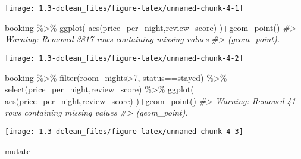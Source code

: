 \documentclass[
]{article}
\newenvironment{Shaded}{\begin{snugshade}}{\end{snugshade}}
\newcommand{\CommentTok}[1]{\textcolor[rgb]{0.56,0.35,0.01}{\textit{#1}}}
\newcommand{\DecValTok}[1]{\textcolor[rgb]{0.00,0.00,0.81}{#1}}
\newcommand{\FunctionTok}[1]{\textcolor[rgb]{0.00,0.00,0.00}{#1}}
\newcommand{\NormalTok}[1]{#1}
\newcommand{\SpecialCharTok}[1]{\textcolor[rgb]{0.00,0.00,0.00}{#1}}
\newcommand{\StringTok}[1]{\textcolor[rgb]{0.31,0.60,0.02}{#1}}
\begin{document}
\texttt{[image: 1.3-dclean\_files/figure-latex/unnamed-chunk-4-1]}

\begin{Shaded}
\begin{Highlighting}[]

\NormalTok{booking }\SpecialCharTok{\%\textgreater{}\%} 
  \FunctionTok{ggplot}\NormalTok{(}
    \FunctionTok{aes}\NormalTok{(price\_per\_night,review\_score)}
\NormalTok{  )}\SpecialCharTok{+}\FunctionTok{geom\_point}\NormalTok{()}
\CommentTok{\#\textgreater{} Warning: Removed 3817 rows containing missing values}
\CommentTok{\#\textgreater{} (geom\_point).}
\end{Highlighting}
\end{Shaded}

\texttt{[image: 1.3-dclean\_files/figure-latex/unnamed-chunk-4-2]}

\begin{Shaded}
\begin{Highlighting}[]

\NormalTok{booking }\SpecialCharTok{\%\textgreater{}\%} 
  \FunctionTok{filter}\NormalTok{(room\_nights}\SpecialCharTok{\textgreater{}}\DecValTok{7}\NormalTok{, status}\SpecialCharTok{==}\StringTok{\textquotesingle{}stayed\textquotesingle{}}\NormalTok{) }\SpecialCharTok{\%\textgreater{}\%} 
  \FunctionTok{select}\NormalTok{(price\_per\_night,review\_score) }\SpecialCharTok{\%\textgreater{}\%} 
  \FunctionTok{ggplot}\NormalTok{(}
    \FunctionTok{aes}\NormalTok{(price\_per\_night,review\_score)}
\NormalTok{  )}\SpecialCharTok{+}\FunctionTok{geom\_point}\NormalTok{()}
\CommentTok{\#\textgreater{} Warning: Removed 41 rows containing missing values}
\CommentTok{\#\textgreater{} (geom\_point).}
\end{Highlighting}
\end{Shaded}

\texttt{[image: 1.3-dclean\_files/figure-latex/unnamed-chunk-4-3]}

mutate
\end{document}
